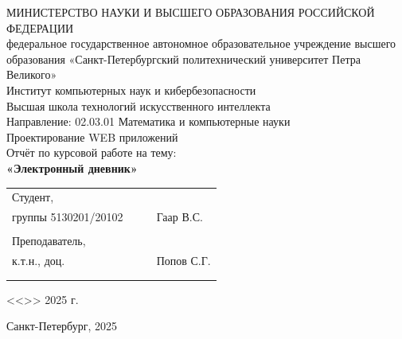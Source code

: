 \documentclass[a4paper, final]{article}
\begin{document}
\begin{center}
\hfill \break
\hfill \break
\normalsize{МИНИСТЕРСТВО НАУКИ И ВЫСШЕГО ОБРАЗОВАНИЯ РОССИЙСКОЙ ФЕДЕРАЦИИ\\
 федеральное государственное автономное образовательное учреждение высшего образования «Санкт-Петербургский политехнический университет Петра Великого»\\[10pt]}
\normalsize{Институт компьютерных наук и кибербезопасности}\\[10pt] 
\normalsize{Высшая школа технологий искусственного интеллекта}\\[10pt] 
\normalsize{Направление: 02.03.01 Математика и компьютерные науки}\\

\hfill \break
\hfill \break
\hfill \break
\large{Проектирование WEB приложений}\\
\hfill \break
\large{Отчёт по курсовой работе на тему:}\\
\large{\textbf{«Электронный дневник»\\}}

\hfill \break
\hfill \break
\end{center}
 
\small{ 
\begin{tabular}{lrrl}
\!\!\!Студент, & \hspace{2cm} & & \\
\!\!\!группы 5130201/20102 & \hspace{2cm} & \underline{\hspace{3cm}} & Гаар В.С. \\\\
\!\!\!Преподаватель, \hspace{2cm} & & \\
\!\!\!к.т.н., доц. & \hspace{2cm} & \underline{\hspace{3cm}} &  Попов С.Г. \\\\
&&\hspace{5cm}
\end{tabular}
\begin{flushright}
<<\underline{\hspace{1cm}}>>\underline{\hspace{2.5cm}} 2025 г.
\end{flushright}
}

\hfill \break
\hfill \break
\begin{center} \small{Санкт-Петербург, 2025} \end{center}
\thispagestyle{empty} %
\end{document}
